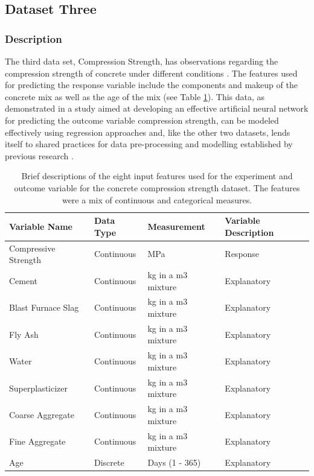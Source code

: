 \documentclass[10pt]{article}\usepackage[]{graphicx}\usepackage[]{xcolor}
\begin{document}
\subsection{Dataset Three}
\subsubsection{Description}
The third data set, Compression Strength, has observations regarding the compression strength of concrete under different conditions \cite{Data:Compress}. The features used for predicting the response variable include the components and makeup of the concrete mix as well as the age of the mix (see Table \ref{tab:concrete_vars}). This data, as demonstrated in a study aimed at developing an effective artificial neural network for predicting the outcome variable compression strength, can be modeled effectively using regression approaches and, like the other two datasets, lends itself to shared practices for data pre-processing and modelling established by previous research \cite{RelatedWork:Concrete}. \\

\begin{table}[h!]
  \begin{center}
    \begin{tabular}{l|l|l|l} %
      \textbf{Variable Name} & \textbf{Data Type} & \textbf{Measurement} & \textbf{Variable Description}\\
      \hline
      Compressive Strength & Continuous & MPa & Response \\
      Cement & Continuous & kg in a m3 mixture & Explanatory \\
      Blast Furnace Slag & Continuous & kg in a m3 mixture & Explanatory \\
      Fly Ash & Continuous & kg in a m3 mixture & Explanatory \\
      Water & Continuous & kg in a m3 mixture & Explanatory\\
      Superplasticizer & Continuous & kg in a m3 mixture & Explanatory\\
      Coarse Aggregate & Continuous & kg in a m3 mixture & Explanatory\\
      Fine Aggregate & Continuous & kg in a m3 mixture & Explanatory\\
      Age & Discrete & Days (1 - 365) & Explanatory \\
    \end{tabular}
    \caption{Brief descriptions of the eight input features used for the experiment and outcome variable for the concrete compression strength dataset. The features were a mix of continuous and categorical measures.}
    \label{tab:concrete_vars}
  \end{center}
\end{table}
\end{document}
